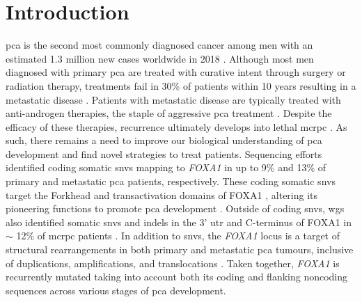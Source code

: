 \section{Introduction}

\Gls{pca} is the second most commonly diagnosed cancer among men with an estimated 1.3 million new cases worldwide in 2018 \cite{brayGlobalCancerStatistics2018}.
Although most men diagnosed with primary \gls{pca} are treated with curative intent through surgery or radiation therapy, treatments fail in 30\% of patients within 10 years \cite{boorjianLongTermOutcomeRadical2007} resulting in a metastatic disease \cite{litwinDiagnosisTreatmentProstate2017}.
Patients with metastatic disease are typically treated with anti-androgen therapies, the staple of aggressive \gls{pca} treatment \cite{attardProstateCancer2016}.
Despite the efficacy of these therapies, recurrence ultimately develops into lethal \gls{mcrpc} \cite{attardProstateCancer2016}.
As such, there remains a need to improve our biological understanding of \gls{pca} development and find novel strategies to treat patients.
Sequencing efforts identified coding somatic \glspl{snv} mapping to \emph{FOXA1} in up to 9\% \cite{abeshouseMolecularTaxonomyPrimary2015,fraserGenomicHallmarksLocalized2017,barbieriExomeSequencingIdentifies2012, grassoMutationalLandscapeLethal2012,paroliaDistinctStructuralClasses2019,adamsFOXA1MutationsAlter2019} and 13\% \cite{paroliaDistinctStructuralClasses2019,adamsFOXA1MutationsAlter2019,robinsonIntegrativeClinicalGenomics2015} of primary and metastatic \gls{pca} patients, respectively.
These coding somatic \glspl{snv} target the Forkhead and transactivation domains of FOXA1 \cite{robinsonFOXA1MutationsHormonedependent2013}, altering its pioneering functions to promote \gls{pca} development \cite{adamsFOXA1MutationsAlter2019,gaoForkheadDomainMutations2019}.
Outside of coding \glspl{snv}, \gls{wgs} also identified somatic \glspl{snv} and indels in the 3' \gls{utr} and C-terminus of FOXA1 in $\sim$ 12\% of \gls{mcrpc} patients \cite{annalaFrequentMutationFOXA12018}.
In addition to \glspl{snv}, the \emph{FOXA1} locus is a target of structural rearrangements in both primary and metastatic \gls{pca} tumours, inclusive of duplications, amplifications, and translocations \cite{paroliaDistinctStructuralClasses2019,adamsFOXA1MutationsAlter2019}.
Taken together, \emph{FOXA1} is recurrently mutated taking into account both its coding and flanking noncoding sequences across various stages of \gls{pca} development.

